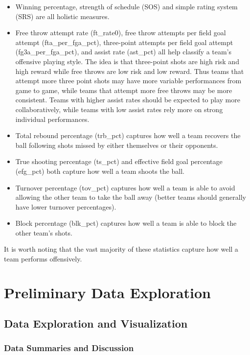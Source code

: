 \documentclass[10pt,a4paper, hidelinks]{article} %
\begin{document}
\begin{itemize}
	\item Winning percentage, strength of schedule (SOS) and simple rating system (SRS) are all holistic measures.
	\item Free throw attempt rate (ft\_rate0), free throw attempts per field goal attempt (fta\_per\_fga\_pct),  three-point attempts per field goal attempt (fg3a\_per\_fga\_pct), and assist rate (ast\_pct) all help classify a team's offensive playing style. The idea is that three-point shots are high risk and high reward while free throws are low risk and low reward. Thus teams that attempt more three point shots may have more variable performances from game to game, while teams that attempt more free throws may be more consistent. Teams with higher assist rates should be expected to play more collaboratively, while teams with low assist rates rely more on strong individual performances.
	\item Total rebound percentage (trb\_pct) captures how well a team recovers the ball following shots missed by either themselves or their opponents.
	\item True shooting percentage (ts\_pct) and effective field goal percentage (efg\_pct) both capture how well a team shoots the ball.
	\item Turnover percentage (tov\_pct) captures how well a team is able to avoid allowing the other team to take the ball away (better teams should generally have lower turnover percentages).
	\item Block percentage (blk\_pct)  captures how well a team is able to block the other team's shots.
\end{itemize}

It is worth noting that the vast majority of these statistics capture how well a team performs offensively.  

\section{Preliminary Data Exploration}

\subsection{Data Exploration and Visualization}

\subsubsection{Data Summaries and Discussion}
\end{document}
